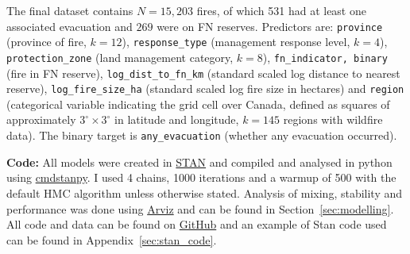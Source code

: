 The final dataset contains $N=15,203$ fires, of which 531 had at least one associated evacuation and $269$ were on FN reserves. Predictors are: \texttt{province} (province of fire, $k=12$), \texttt{response\_type} (management response level, $k=4$), \texttt{protection\_zone} (land management category, $k=8$), \texttt{fn\_indicator, binary} (fire in FN reserve), \texttt{log\_dist\_to\_fn\_km} (standard scaled log distance to nearest reserve), \texttt{log\_fire\_size\_ha} (standard scaled log fire size in hectares) and \texttt{region} (categorical variable indicating the grid cell over Canada, defined as squares of approximately $3^\circ \times 3^\circ$ in latitude and longitude, $k=145$ regions with wildfire data). The binary target is \texttt{any\_evacuation} (whether any evacuation occurred).

\textbf{Code:} All models were created in \href{https://mc-stan.org/}{STAN} and compiled and analysed in python using \href{https://github.com/stan-dev/cmdstanpy}{cmdstanpy}. I used 4 chains, 1000 iterations and a warmup of 500 with the default HMC algorithm unless otherwise stated. Analysis of mixing, stability and performance was done using \href{https://github.com/arviz-devs/arviz}{Arviz} and can be found in Section~\ref{sec:modelling}. All code and data can be found on \href{https://github.com/PierreRL/Wildfire_Evacuations}{GitHub} and an example of Stan code used can be found in Appendix~\ref{sec:stan_code}.